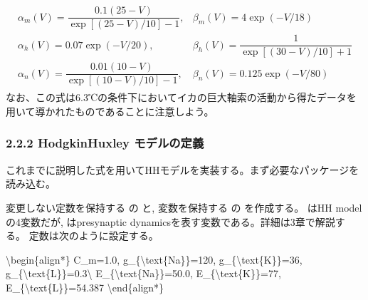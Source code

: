 \documentclass[letterpaper,10pt,english]{sphinxmanual}
\begin{document}
\begin{equation*}
\begin{split}
\begin{array}{ll}
\alpha_{m}(V)=\dfrac {0.1(25-V)}{\exp \left[(25-V)/10\right]-1}, &\beta_{m}(V)=4\exp {(-V/18)}\\
\alpha_{h}(V)=0.07\exp {(-V/20)}, & \beta_{h}(V)={\dfrac{1}{\exp {\left[(30-V)/10 \right]}+1}}\\
\alpha_{n}(V)={\dfrac {0.01(10-V)}{\exp {\left[(10-V)/10\right]}-1}},& \beta_{n}(V)=0.125\exp {(-V/80)} 
\end{array}
\end{split}
\end{equation*}
なお、この式は6.3℃の条件下においてイカの巨大軸索の活動から得たデータを用いて導かれたものであることに注意しよう。


\subsubsection{2.2.2 Hodgkin\sphinxhyphen{}Huxley モデルの定義}
\label{\detokenize{2-2_hodgkinhuxley:id2}}
これまでに説明した式を用いてHHモデルを実装する。まず必要なパッケージを読み込む。

\begin{sphinxVerbatim}[commandchars=\\\{\}]
  
   
\end{sphinxVerbatim}

変更しない定数を保持する  の  と, 変数を保持する  の  を作成する。 はHH modelの4変数だが,  はpre\sphinxhyphen{}synaptic dynamicsを表す変数である。詳細は3章で解説する。 定数は次のように設定する。

\textbackslash{}begin\{align*\}
C\_m=1.0, g\_\{\textbackslash{}text\{Na\}\}=120, g\_\{\textbackslash{}text\{K\}\}=36, g\_\{\textbackslash{}text\{L\}\}=0.3\textbackslash{}
E\_\{\textbackslash{}text\{Na\}\}=50.0, E\_\{\textbackslash{}text\{K\}\}=\sphinxhyphen{}77, E\_\{\textbackslash{}text\{L\}\}=\sphinxhyphen{}54.387
\textbackslash{}end\{align*\}
\end{document}
